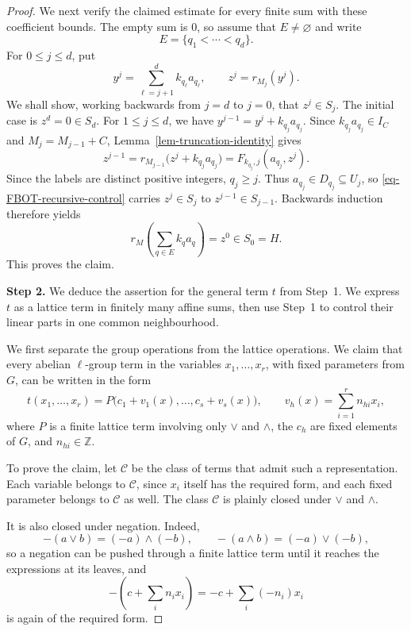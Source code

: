 \documentclass[preprint,3p]{elsarticle}
\theoremstyle{plain}
\theoremstyle{definition}
\numberwithin{equation}{section}
\begin{document}
\begin{proof}
We next verify the claimed estimate for every finite sum
with these coefficient bounds.
The empty sum is $0$, so assume that $E\neq\varnothing$ and write
\[
 E=\{q_1<\cdots<q_d\}.
\]
For $0\leq j\leq d$, put
\[
 y^j=\sum_{\ell=j+1}^d k_{q_\ell}a_{q_\ell},
 \qquad z^j=r_{M_j}(y^j).
\]
We shall show, working backwards from $j=d$ to $j=0$, that
$z^j\in S_j$.
The initial case is $z^d=0\in S_d$.
For $1\leq j\leq d$, we have
$y^{j-1}=y^j+k_{q_j}a_{q_j}$.
Since $k_{q_j}a_{q_j}\in I_C$ and $M_j=M_{j-1}+C$,
Lemma~\ref{lem-truncation-identity} gives
\begin{equation}
\label{eq-FBOT-backward-step}
 z^{j-1}
 =r_{M_{j-1}}\bigl(z^j+k_{q_j}a_{q_j}\bigr)
 =F_{k_{q_j},j}(a_{q_j},z^j).
\end{equation}
Since the labels are distinct positive integers, $q_j\geq j$.
Thus $a_{q_j}\in D_{q_j}\subseteq U_j$, so
\eqref{eq-FBOT-recursive-control} carries $z^j\in S_j$
to $z^{j-1}\in S_{j-1}$.
Backwards induction therefore yields
\[
 r_M\left(\sum_{q\in E}k_q a_q\right)=z^0\in S_0=H.
\]
This proves the claim.

\textbf{Step 2.} We deduce the assertion for the general term $t$
from Step~1.
We express $t$ as a lattice term in finitely many affine sums,
then use Step~1 to control their linear parts in one common
neighbourhood.

We first separate the group operations from the lattice operations.
We claim that every abelian $\ell$-group
term in the variables $x_1,\ldots,x_r$, with fixed parameters from $G$,
can be written in the form
\begin{equation}
\label{eq-FBOT-normal-form}
 t(x_1,\ldots,x_r)
 =
 P\bigl(c_1+v_1(x),\ldots,c_s+v_s(x)\bigr),
 \qquad
 v_h(x)=\sum_{i=1}^r n_{hi}x_i,
\end{equation}
where $P$ is a finite lattice term involving only $\vee$ and $\wedge$,
the $c_h$ are fixed elements of $G$, and $n_{hi}\in\mathbb Z$.

To prove the claim, let $\mathcal C$ be the class of terms that admit
such a representation.  Each variable belongs to $\mathcal C$, since
$x_i$ itself has the required form, and each fixed parameter belongs to
$\mathcal C$ as well.  The class $\mathcal C$ is plainly closed under
$\vee$ and $\wedge$.

It is also closed under negation.  Indeed,
\[
 -(a\vee b)=(-a)\wedge(-b),
 \qquad
 -(a\wedge b)=(-a)\vee(-b),
\]
so a negation can be pushed through a finite lattice term until it reaches
the expressions at its leaves, and
\[
 -\left(c+\sum_i n_i x_i\right)
 =
 -c+\sum_i(-n_i)x_i
\]
is again of the required form.


\end{proof}
\end{document}
